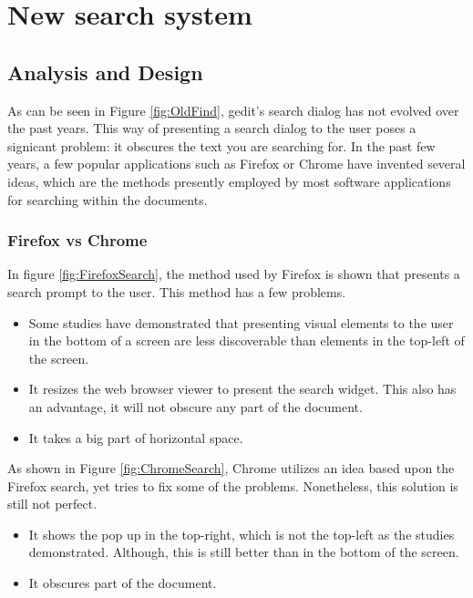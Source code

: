 
\chapter{New search system}\label{chap:SearchSystem}

\section{Analysis and Design}


As can be seen in Figure \ref{fig:OldFind}, gedit's search dialog has not evolved over the past years. This way of presenting 
a search dialog to the user poses a signicant problem: it obscures the text you are searching for. In the past few years, a few popular applications 
such as Firefox or Chrome have invented several ideas, which are the methods presently employed by most software applications 
for searching within the documents.

\newpage
\subsection{Firefox vs Chrome}

In figure \ref{fig:FirefoxSearch}, the method used by Firefox is shown that presents a search prompt to the user. This method has a few problems.
\begin{itemize}
  \item Some studies have demonstrated that presenting visual elements to the user in the bottom of a screen are less discoverable 
   than elements in the top-left of the screen.
  \item It resizes the web browser viewer to present the search widget. This also has an advantage, it will not obscure any part of the document.
  \item It takes a big part of horizontal space.
\end{itemize}


As shown in Figure \ref{fig:ChromeSearch}, Chrome utilizes an idea based upon the Firefox search, yet tries to fix some of the problems. Nonetheless, this solution is still not perfect.
\begin{itemize}
  \item It shows the pop up in the top-right, which is not the top-left as the studies demonstrated. Although, this is still better than in the bottom of the screen.
  \item It obscures part of the document.
\end{itemize}

